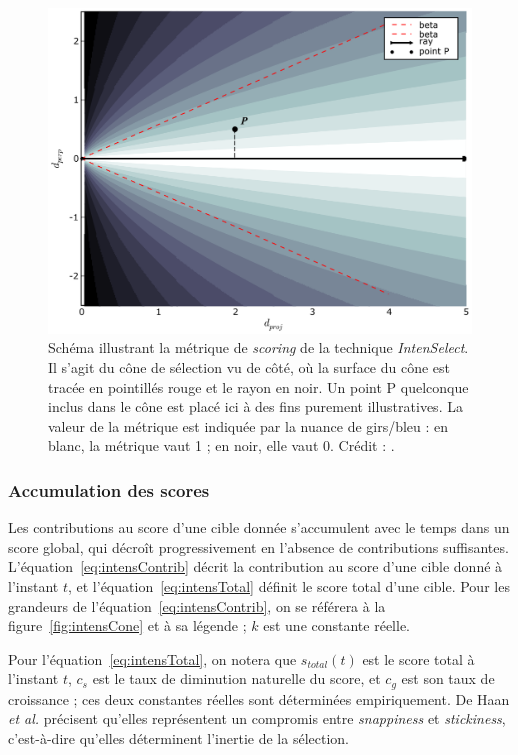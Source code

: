 	\begin{figure}[H]
		\centering
		\includegraphics[width=\textwidth]{figures/ch2/intensMetric}
		\caption[Métrique de \emph{scoring} de la technique \emph{IntenSelect}]{Schéma illustrant la métrique de \emph{scoring} de la technique \emph{IntenSelect}. Il s'agit du cône de sélection vu de côté, où la surface du cône est tracée en pointillés rouge et le rayon en noir. Un point P quelconque inclus dans le cône est placé ici à des fins purement illustratives. La valeur de la métrique est indiquée par la nuance de girs/bleu : en blanc, la métrique vaut 1 ; en noir, elle vaut 0. Crédit : \cite{de2005intenselect}.}
		\label{fig:intensMetric}
	\end{figure}
	
	\subsubsection{Accumulation des scores}
	Les contributions au score d'une cible donnée s'accumulent avec le temps dans un score global, qui décroît progressivement en l'absence de contributions suffisantes. L'équation~\ref{eq:intensContrib} décrit la contribution au score d'une cible donné à l'instant $t$, et l'équation~\ref{eq:intensTotal} définit le score total d'une cible. Pour les grandeurs de l'équation~\ref{eq:intensContrib}, on se référera à la figure~\ref{fig:intensCone} et à sa légende ; $k$ est une constante réelle.
	
	Pour l'équation~\ref{eq:intensTotal}, on notera que $s_{total}(t)$ est le score total à l'instant $t$, $c_{s}$ est le taux de diminution naturelle du score, et $c_{g}$ est son taux de croissance ; ces deux constantes réelles sont déterminées empiriquement. De Haan \emph{et al.} précisent qu'elles représentent un compromis entre \emph{snappiness} et \emph{stickiness}, c'est-à-dire qu'elles déterminent l'inertie de la sélection.
	
